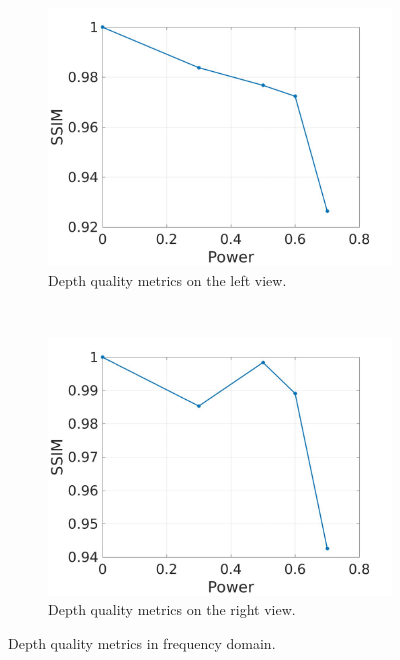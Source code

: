\begin{figure}[h!]
    \centering
    \begin{subfigure}[t]{0.5\textwidth}
        \centering
\includegraphics[width=1\textwidth]{./img/qm/qm_right.jpg}
          \caption{\small{Depth quality metrics on the left view.}}
\label{fig:qmcr}

    \end{subfigure}%
    ~ 
    \begin{subfigure}[t]{0.5\textwidth}
        \centering
\includegraphics[width=1\textwidth]{./img/qm/qm_disp_right.jpg}
           \caption{\small{Depth quality metrics on the right view.}}
\label{fig:qmdr}
    \end{subfigure}
    \caption{Depth quality metrics in frequency domain. }
        \label{fig:qmr}
\end{figure}
\clearpage

